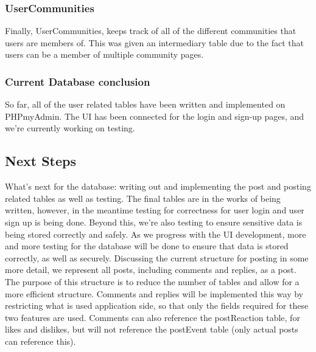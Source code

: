 \documentclass[compsoc, 10, draftclsnofoot, onecolumn]{IEEEtran}
\begin{document}
\subsubsection{UserCommunities} Finally, UserCommunities, keeps track of all of the different communities that users are members of. This was given an intermediary table due to the fact that users can be a member of multiple community pages. 
\subsubsection{Current Database conclusion} So far, all of the user related tables have been written and implemented on PHPmyAdmin. The UI has been connected for the login and sign-up pages, and we're currently working on testing. 
\subsection{Next Steps}
What's next for the database: writing out and implementing the post and posting related tables as well as testing. The final tables are in the works of being written, however, in the meantime testing for correctness for user login and user sign up is being done. Beyond this, we're also testing to ensure sensitive data is being stored correctly and safely. As we progress with the UI development, more and more testing for the database will be done to ensure that data is stored correctly, as well as securely. Discussing the current structure for posting in some more detail, we represent all posts, including comments and replies, as a post. The purpose of this structure is to reduce the number of tables and allow for a more efficient structure. Comments and replies will be implemented this way by restricting what is used application side, so that only the fields required for these two features are used. Comments can also reference the postReaction table, for likes and dislikes, but will not reference the postEvent table (only actual posts can reference this).
\end{document}
